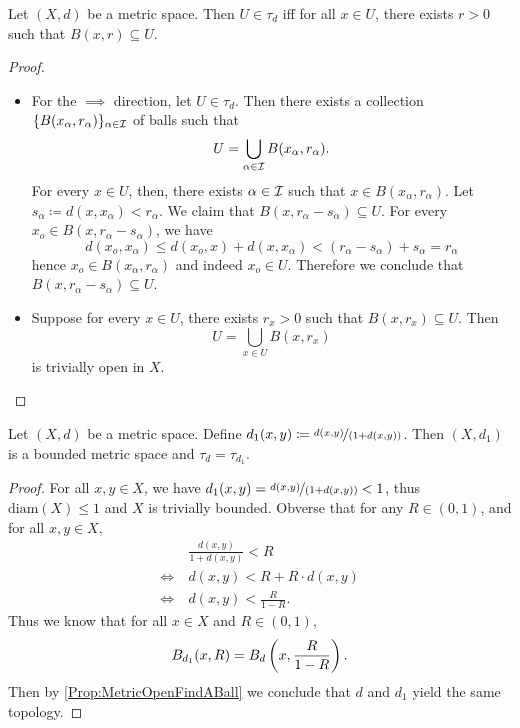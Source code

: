 \documentclass[screen,single]{techreport}
\numberwithin{equation}{section}
\begin{document}
\begin{proposition}\label{Prop:MetricOpenFindABall}
	Let $(X,d)$ be a metric space. Then $U \in \tau_d$ iff for all $x \in U$, there exists $r >0$ such that $B(x,r) \subseteq U$.
\end{proposition}
\begin{proof}\
	\begin{itemize}
		\item For the ${\implies}$ direction, let $U \in \tau_d$.
		Then there exists a collection $\{B(x_\alpha,r_\alpha)\}_{\alpha \in \mathcal{I}}$ of balls such that
		\[
		U = \bigcup_{\alpha \in \mathcal{I}} B(x_\alpha,r_\alpha).
		\]
		For every $x \in U$, then, there exists $\alpha \in \mathcal{I}$ such that $x \in B(x_\alpha,r_\alpha)$.
		Let $s_\alpha \coloneqq d(x,x_\alpha) < r_\alpha$.
		We claim that $B(x,r_\alpha-s_\alpha) \subseteq U$.
		For every $x_o \in B(x,r_\alpha-s_\alpha)$, we have
		\[
		d(x_o,x_\alpha) \le d(x_o,x) + d(x,x_\alpha) < (r_\alpha - s_\alpha) + s_\alpha = r_\alpha
		\]
		hence $x_o \in B(x_\alpha,r_\alpha)$ and indeed $x_o \in U$.
		Therefore we conclude that $B(x,r_\alpha-s_\alpha) \subseteq U$.
		
		\item Suppose for every $x \in U$, there exists $r_x > 0$ such that $B(x,r_x) \subseteq U$.
		Then
		\[
		U = \bigcup_{x \in U} B(x,r_x)
		\]
		is trivially open in $X$.
	\end{itemize}
\end{proof}

\begin{proposition}\label{Prop:MetricCanAlwaysBounded}
	Let $(X,d)$ be a metric space.
	Define $d_1(x,y) \coloneqq \nicefrac{d(x,y)}{(1 + d(x,y))}$.
	Then $(X,d_1)$ is a bounded metric space and $\tau_d = \tau_{d_1}$.
\end{proposition}
\begin{proof}
	For all $x,y \in X$, we have $d_1(x,y) = \nicefrac{d(x,y)}{(1+d(x,y))} < 1$, thus $\mathrm{diam}(X) \le 1$ and $X$ is trivially bounded.
	Obverse that for any $R \in (0,1)$, and for all $x, y \in X$,
	\begin{align*}
		& \frac{d(x,y)}{1+d(x,y)} < R \\
		\iff~ & d(x,y) < R + R \cdot d(x,y) \\
		\iff~ & d(x,y) < \frac{R}{1-R}.
	\end{align*}
	Thus we know that for all $x \in X$ and $R \in (0,1)$,
	\[
	B_{d_1}(x,R) = B_d\left({x, \frac{R}{1-R} }\right).
	\]
	Then by \cref{Prop:MetricOpenFindABall} we conclude that $d$ and $d_1$ yield the same topology.
\end{proof}
\end{document}
